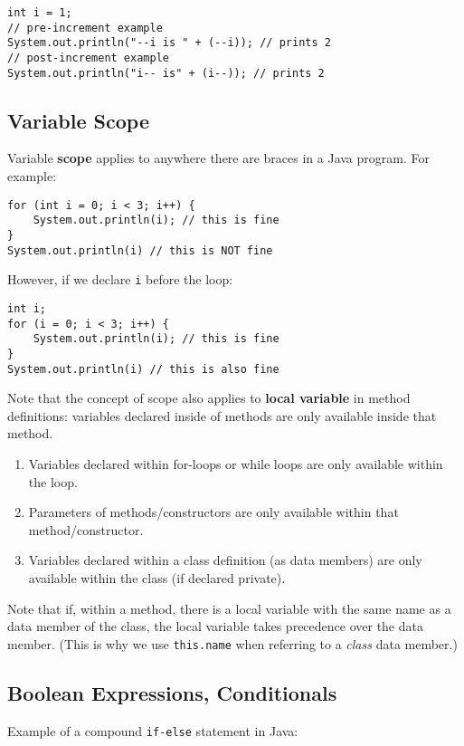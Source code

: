 \documentclass{article}
\begin{document}
\begin{flushleft}
\begin{verbatim}
int i = 1;
// pre-increment example
System.out.println("--i is " + (--i)); // prints 2
// post-increment example
System.out.println("i-- is" + (i--)); // prints 2
\end{verbatim}

\subsection{Variable Scope}

Variable \textbf{scope} applies to anywhere there are braces in a Java program. For example:
\begin{verbatim}
for (int i = 0; i < 3; i++) {
    System.out.println(i); // this is fine
}
System.out.println(i) // this is NOT fine
\end{verbatim}
However, if we declare \texttt{i} before the loop:
\begin{verbatim}
int i;
for (i = 0; i < 3; i++) {
    System.out.println(i); // this is fine
}
System.out.println(i) // this is also fine
\end{verbatim}

Note that the concept of scope also applies to \textbf{local variable} in method definitions: variables declared inside of methods are only available inside that method.

\begin{enumerate}
    \item Variables declared within for-loops or while loops are only available within the loop.
    \item Parameters of methods/constructors are only available within that method/constructor.
    \item Variables declared within a class definition (as data members) are only available within the class (if declared private).
\end{enumerate}

Note that if, within a method, there is a local variable with the same name as a data member of the class, the local variable takes precedence over the data member. (This is why we use \texttt{this.name} when referring to a \textit{class} data member.)

\subsection{Boolean Expressions, Conditionals}

Example of a compound \texttt{if-else} statement in Java:


\end{flushleft}
\end{document}
